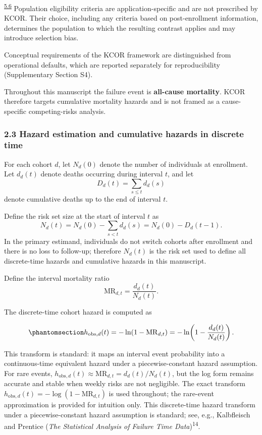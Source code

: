 \documentclass[
]{article}
\begin{document}
\textsuperscript{\hyperlink{issue-5.6}{5.6}} {\color{red}Population eligibility criteria are application-specific and are not prescribed by KCOR. Their choice, including any criteria based on post-enrollment information, determines the population to which the resulting contrast applies and may introduce selection bias.}

Conceptual requirements of the KCOR framework are distinguished from operational defaults, which are reported separately for reproducibility (Supplementary Section S4).

Throughout this manuscript the failure event is \textbf{all-cause mortality}. KCOR therefore targets cumulative mortality hazards and is not framed as a cause-specific competing-risks analysis.

\subsubsection{2.3 Hazard estimation and cumulative hazards in discrete time}\label{hazard-estimation-and-cumulative-hazards-in-discrete-time}

For each cohort \(d\), let \(N_d(0)\) denote the number of individuals at enrollment. Let \(d_d(t)\) denote deaths occurring during interval \(t\), and let \[D_d(t) = \sum_{s \le t} d_d(s)\] denote cumulative deaths up to the end of interval \(t\).

Define the risk set size at the start of interval \(t\) as \[N_d(t) = N_d(0) - \sum_{s < t} d_d(s) = N_d(0) - D_d(t-1).\] In the primary estimand, individuals do not switch cohorts after enrollment and there is no loss to follow-up; therefore \(N_d(t)\) is the risk set used to define all discrete-time hazards and cumulative hazards in this manuscript.

Define the interval mortality ratio \[\mathrm{MR}_{d,t} = \frac{d_d(t)}{N_d(t)}.\]

The discrete-time cohort hazard is computed as

\begin{equation}\protect\phantomsection\label{eq:hazard-discrete}{h_{\mathrm{obs},d}(t) = -\ln\!\left(1 - \mathrm{MR}_{d,t}\right) = -\ln\!\left(1 - \frac{d_d(t)}{N_d(t)}\right).}\end{equation}

This transform is standard: it maps an interval event probability into a continuous-time equivalent hazard under a piecewise-constant hazard assumption. For rare events, \(h_{\mathrm{obs},d}(t) \approx \mathrm{MR}_{d,t} = d_d(t)/N_d(t)\), but the log form remains accurate and stable when weekly risks are not negligible. The exact transform \(h_{\mathrm{obs},d}(t) = -\log(1 - \mathrm{MR}_{d,t})\) is used throughout; the rare-event approximation is provided for intuition only. This discrete-time hazard transform under a piecewise-constant hazard assumption is standard; see, e.g., Kalbfleisch and Prentice (\emph{The Statistical Analysis of Failure Time Data})\textsuperscript{14}.
\end{document}

